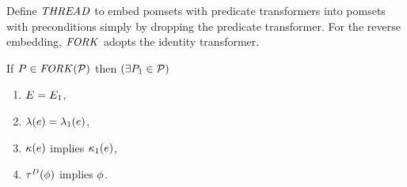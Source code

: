 
Define $\sTHREAD{}$ to embed pomsets with predicate transformers into pomsets with preconditions
simply by dropping the predicate transformer.
For the reverse embedding, $\sFORK{}$ adopts the identity transformer.
\begin{definition}
  If $\aPS\SB0 \in \sFORK{\aPSS}$ then
  $(\exists\aPS_1\in\aPSS)$
  \begin{enumerate}
  \item $\aEvs\SB0=\aEvs_1$,
  \item $\labelingAct\SB0(\aEv) = \labelingAct_1(\aEv)$,
  \item $\labelingForm\SB0(\aEv)$ implies $\labelingForm_1(\aEv)$, 
  \item $\aTr[\bEvs]\SB0(\aForm)$ implies $\aForm$.
  \end{enumerate}  
\end{definition}

